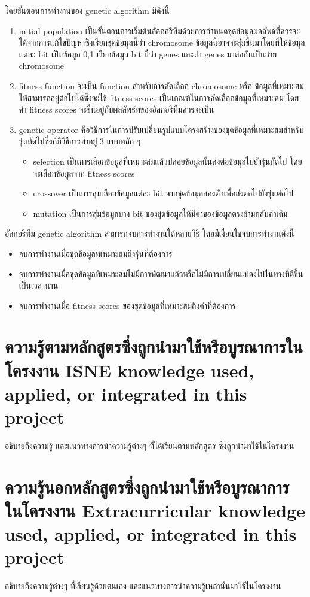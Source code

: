 โดยขั้นตอนการทำงานของ genetic algorithm มีดังนี้ 
\begin{enumerate}
  \item initial population เป็นขั้นตอนการเริ่มต้นอัลกอริทึมด้วยการกำหนดชุดข้อมูลผลลัพธ์ที่ควรจะได้จากการแก้ไขปัญหาซึ่งเรียกชุดข้อมูลนี้ว่า chromosome ข้อมูลนี้อาจจะสุ่มขึ้นมาโดยที่ให้ข้อมูลแต่ละ bit เป็นข้อมูล 0,1 เรียกข้อมูล bit นี้ว่า genes และนำ genes มาต่อกันเป็นสาย chromosome 
  \item fitness function จะเป็น function สำหรับการคัดเลือก chromosome หรือ ข้อมูลที่เหมาะสมให้สามารถอยู่ต่อไปได้ซึ่งจะใช้ fitness scores เป็นเกณฑ์ในการคัดเลือกข้อมูลที่เหมาะสม
  โดยค่า fitness scores จะขึ้นอยู่กับผลลัพธ์ทของอัลกอริทึมควรจะเป็น
  \item genetic operator คือวิธีการในการปรับเปลี่ยนรูปแบบโครงสร้างของชุดข้อมูลที่เหมาะสมสำหรับรุ่นถัดไปซึ่งก็มีวิธีการทำอยู่ 3 แบบหลัก ๆ 
  \begin{itemize}
  \item selection เป็นการเลือกข้อมูลที่เหมาะสมแล้วปล่อยข้อมูลนั้นส่งต่อข้อมูลไปยังรุ่นถัดไป โดยจะเลือกข้อมูลจาก fitness scores
  \item crossover เป็นการสุ่มเลือกข้อมูลแต่ละ bit จากชุดข้อมูลสองตัวเพื่อส่งต่อไปยังรุ่นต่อไป
  \item mutation เป็นการสุ่มข้อมูลบาง bit ของชุดข้อมูลให้มีค่าของข้อมูลตรงข้ามกลับค่าเดิม
\end{itemize}
\end{enumerate}
อัลกอริทึม genetic algorithm สามารถจบการทำงานได้หลายวิธี โดยมีเงื่อนไขจบการทำงานดังนี้
\begin{itemize}
  \item จบการทำงานเมื่อชุดข้อมูลที่เหมาะสมถึงรุ่นที่ต้องการ 
  \item จบการทำงานเมื่อชุดข้อมูลที่เหมาะสมไม่มีการพัฒนาแล้วหรือไม่มีการเปลี่ยนแปลงไปในทางที่ดีขึ้นเป็นเวลานาน
  \item จบการทำงานเมื่อ fitness scores ของชุดข้อมูลที่เหมาะสมถึงค่าที่ต้องการ
\end{itemize}


\section{\ifcpe%
ความรู้ตามหลักสูตรซึ่งถูกนำมาใช้หรือบูรณาการในโครงงาน
\else%
ISNE knowledge used, applied, or integrated in this project
\fi
}

อธิบายถึงความรู้ และแนวทางการนำความรู้ต่างๆ ที่ได้เรียนตามหลักสูตร ซึ่งถูกนำมาใช้ในโครงงาน

\section{\ifcpe%
ความรู้นอกหลักสูตรซึ่งถูกนำมาใช้หรือบูรณาการในโครงงาน
\else%
Extracurricular knowledge used, applied, or integrated in this project
\fi
}

อธิบายถึงความรู้ต่างๆ ที่เรียนรู้ด้วยตนเอง และแนวทางการนำความรู้เหล่านั้นมาใช้ในโครงงาน
